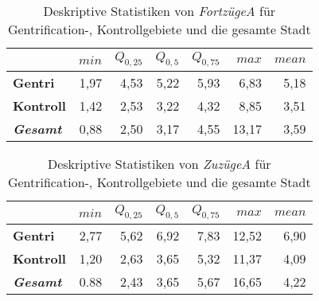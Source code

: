 \begin{table}[H]
\centering
\begin{tabular}{@{}lrrrrrr@{}}
\toprule
               & $min$ & $Q_{0,25}$ & $Q_{0,5}$ & $Q_{0,75}$ & $max$ & $mean$ \\ \midrule
{\bf Gentri}   & 1,97 & 4,53 & 5,22 & 5,93 & 6,83  & 5,18 \\
{\bf Kontroll} & 1,42 & 2,53 & 3,22 & 4,32 & 8,85  & 3,51 \\ \hdashline 
{\bf \textit{Gesamt}} & 0,88 & 2,50 & 3,17 & 4,55  & 13,17 & 3,59 \\ \bottomrule
\end{tabular}
\caption[Deskriptive Statistiken von \textit{FortzügeA}]{Deskriptive Statistiken von \textit{FortzügeA} für Gentrification-, Kontrollgebiete und die gesamte Stadt}
\label{tab:FortzuegeUDAR}
\end{table}

\begin{table}[H]
\centering
\begin{tabular}{@{}lrrrrrr@{}}
\toprule
               & $min$ & $Q_{0,25}$ & $Q_{0,5}$ & $Q_{0,75}$ & $max$ & $mean$ \\ \midrule
{\bf Gentri}   & 2,77  & 5,62       & 6,92      & 7,83       & 12,52 & 6,90   \\
{\bf Kontroll} & 1,20  & 2,63       & 3,65      & 5,32       & 11,37 & 4,09   \\ \hdashline
{\bf \textit{Gesamt}}  & 0.88       & 2,43      & 3,65       & 5,67  & 16,65 & 4,22 \\ \bottomrule
\end{tabular}
\caption[Deskriptive Statistiken von \textit{ZuzügeA}]{Deskriptive Statistiken von \textit{ZuzügeA} für Gentrification-, Kontrollgebiete und die gesamte Stadt}
\label{tab:ZuzuegeUDAR}
\end{table}

